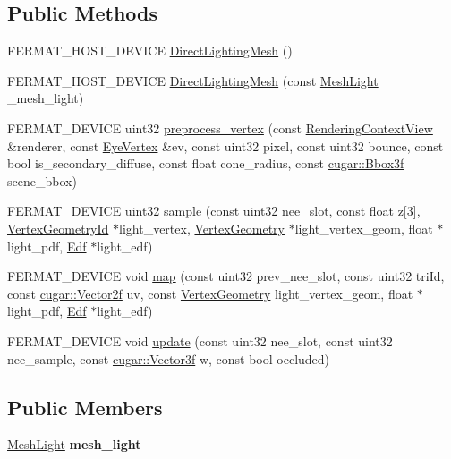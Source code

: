 \subsection*{Public Methods}
\begin{DoxyCompactItemize}
\item 
F\+E\+R\+M\+A\+T\+\_\+\+H\+O\+S\+T\+\_\+\+D\+E\+V\+I\+CE \hyperlink{struct_direct_lighting_mesh_a6f51872d622c3ee9a81e2f433b9e256c}{Direct\+Lighting\+Mesh} ()
\item 
F\+E\+R\+M\+A\+T\+\_\+\+H\+O\+S\+T\+\_\+\+D\+E\+V\+I\+CE \hyperlink{struct_direct_lighting_mesh_af86ba1cf583e3a9e8527afa4d83a2f3d}{Direct\+Lighting\+Mesh} (const \hyperlink{struct_mesh_light}{Mesh\+Light} \+\_\+mesh\+\_\+light)
\item 
F\+E\+R\+M\+A\+T\+\_\+\+D\+E\+V\+I\+CE uint32 \hyperlink{struct_direct_lighting_mesh_a2df01e89667068136231e0c6efd4eefc}{preprocess\+\_\+vertex} (const \hyperlink{struct_rendering_context_view}{Rendering\+Context\+View} \&renderer, const \hyperlink{struct_eye_vertex}{Eye\+Vertex} \&ev, const uint32 pixel, const uint32 bounce, const bool is\+\_\+secondary\+\_\+diffuse, const float cone\+\_\+radius, const \hyperlink{structcugar_1_1_bbox}{cugar\+::\+Bbox3f} scene\+\_\+bbox)
\item 
F\+E\+R\+M\+A\+T\+\_\+\+D\+E\+V\+I\+CE uint32 \hyperlink{struct_direct_lighting_mesh_af509addd3c3bce6853b5721ac85cae4d}{sample} (const uint32 nee\+\_\+slot, const float z\mbox{[}3\mbox{]}, \hyperlink{struct_vertex_geometry_id}{Vertex\+Geometry\+Id} $\ast$light\+\_\+vertex, \hyperlink{struct_vertex_geometry}{Vertex\+Geometry} $\ast$light\+\_\+vertex\+\_\+geom, float $\ast$light\+\_\+pdf, \hyperlink{struct_edf}{Edf} $\ast$light\+\_\+edf)
\item 
F\+E\+R\+M\+A\+T\+\_\+\+D\+E\+V\+I\+CE void \hyperlink{struct_direct_lighting_mesh_a2dabf1d83d06e47ee36c1290e10b0b3e}{map} (const uint32 prev\+\_\+nee\+\_\+slot, const uint32 tri\+Id, const \hyperlink{structcugar_1_1_vector}{cugar\+::\+Vector2f} uv, const \hyperlink{struct_vertex_geometry}{Vertex\+Geometry} light\+\_\+vertex\+\_\+geom, float $\ast$light\+\_\+pdf, \hyperlink{struct_edf}{Edf} $\ast$light\+\_\+edf)
\item 
F\+E\+R\+M\+A\+T\+\_\+\+D\+E\+V\+I\+CE void \hyperlink{struct_direct_lighting_mesh_a3328811ee1cbe8a570f7b5d0b2c6a4f4}{update} (const uint32 nee\+\_\+slot, const uint32 nee\+\_\+sample, const \hyperlink{structcugar_1_1_vector}{cugar\+::\+Vector3f} w, const bool occluded)
\end{DoxyCompactItemize}
\subsection*{Public Members}
\begin{DoxyCompactItemize}
\item 
\mbox{\label{struct_direct_lighting_mesh_a546e8419bdf60853deaca1d754932ade}} 
\hyperlink{struct_mesh_light}{Mesh\+Light} {\bfseries mesh\+\_\+light}
\end{DoxyCompactItemize}
